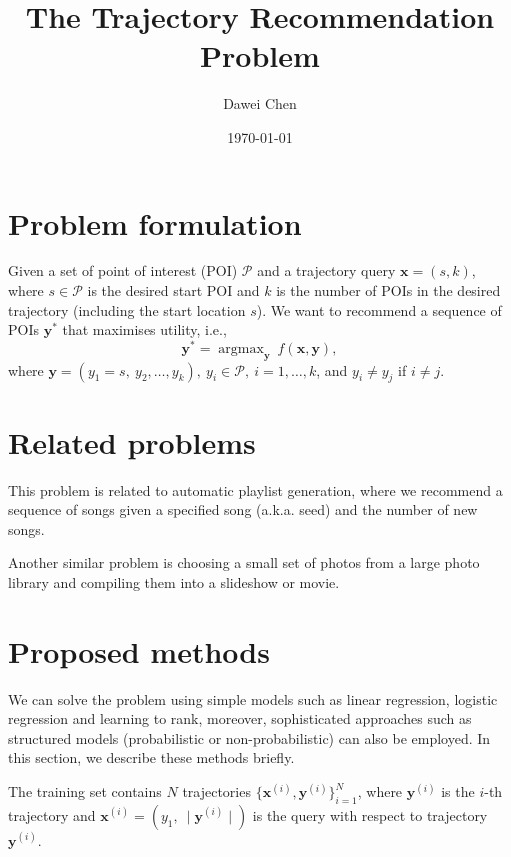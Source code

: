 \documentclass[twocolumn,9pt]{extarticle}
\title{The Trajectory Recommendation Problem}
\author{Dawei Chen}
\date{\today}
\DeclareMathOperator*{\argmax}{argmax}
\begin{document}
\maketitle


\section{Problem formulation}
\label{sec:formulation}

Given a set of point of interest (POI) $\mathcal{P}$ and a trajectory query $\mathbf{x} = (s, k)$,
where $s \in \mathcal{P}$ is the desired start POI and $k$ is the number of POIs in the desired trajectory (including the start location $s$).
We want to recommend a sequence of POIs $\mathbf{y}^*$ that maximises utility, i.e.,
\begin{equation*}
\mathbf{y}^* = \argmax_{\mathbf{y}}~f(\mathbf{x}, \mathbf{y}),
\end{equation*}
where $\mathbf{y} = (y_1 = s,~ y_2, \dots, y_k),~ y_i \in \mathcal{P},~ i=1,\dots,k$, and $y_i \ne y_j$ if $i \ne j$.



\section{Related problems}
\label{sec:related}

This problem is related to automatic playlist generation, 
where we recommend a sequence of songs given a specified song (a.k.a. seed) and the number of new songs.

Another similar problem is choosing a small set of photos from a large photo library and compiling them into a slideshow or movie.



\section{Proposed methods}
\label{sec:methods}

We can solve the problem using simple models such as linear regression, logistic regression and learning to rank,
moreover, sophisticated approaches such as structured models (probabilistic or non-probabilistic) can also be employed.
In this section, we describe these methods briefly.

The training set contains $N$ trajectories 
$\{ \mathbf{x}^{(i)}, \mathbf{y}^{(i)} \}_{i=1}^N$,
where $\mathbf{y}^{(i)}$ is the $i$-th trajectory and $\mathbf{x}^{(i)} = (y_1,~ \mid \mathbf{y}^{(i)} \mid)$ is the query 
with respect to trajectory $\mathbf{y}^{(i)}$.
\end{document}
